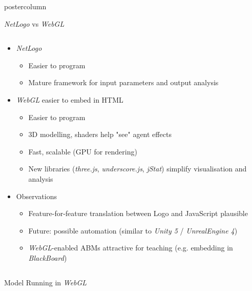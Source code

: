 \documentclass[final,hyperref={pdfpagelabels=false}]{beamer}
\begin{document}
\begin{frame}
\begin{columns}
\begin{column}{.33\textwidth}
\begin{beamercolorbox}[center,wd=\textwidth]{postercolumn}
\begin{minipage}[T]{.95\textwidth}
{            \begin{block}{\textit{NetLogo} vs \textit{WebGL}}
              \begin{columns}
                \begin{column}{.99\textwidth}
                  \begin{itemize}
                    \item \textit{NetLogo}
                      \begin{itemize}
                        \item Easier to program
                        \item Mature framework for input parameters and output analysis
                      \end{itemize}
                    \item \textit{WebGL} easier to embed in HTML
                      \begin{itemize}
                        \item Easier to program
                        \item 3D modelling, shaders help "see" agent effects
                        \item Fast, scalable (GPU for rendering)
                        \item New libraries (\textit{three.js}, \textit{underscore.js}, \textit{jStat}) simplify visualisation and analysis
                      \end{itemize}
                    \item Observations
                      \begin{itemize}
                        \item Feature-for-feature translation between Logo and JavaScript plausible
                        \item Future: possible automation (similar to \textit{Unity 5} / \textit{UnrealEngine 4})
                        \item \textit{WebGL}-enabled ABMs attractive for teaching (e.g. embedding in \textit{BlackBoard})
                      \end{itemize}
                  \end{itemize}
                \end{column}
              \end{columns}
            \end{block}
            \vfill
            \begin{block}{Model Running in \textit{WebGL}}

\end{block}}
\end{minipage}
\end{beamercolorbox}
\end{column}
\end{columns}
\end{frame}
\end{document}
